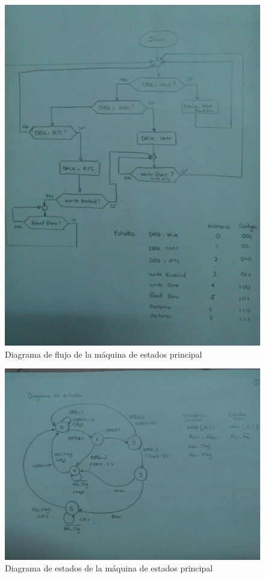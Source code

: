 \documentclass[12pt,a4paper]{report}
\begin{document}
\begin{figure}[hbtp]
	\centering
	\includegraphics[width=16cm]{Img/mainctrl1.jpg}
	\caption{Diagrama de flujo de la máquina de estados principal}
	\label{fig:mainctrl1}
\end{figure}

\begin{figure}[hbtp]
	\centering
	\includegraphics[width=16cm]{Img/mainctrl2.jpg}
	\caption{Diagrama de estados de la máquina de estados principal}
	\label{fig:mainctrl2}
\end{figure}	
\end{document}
